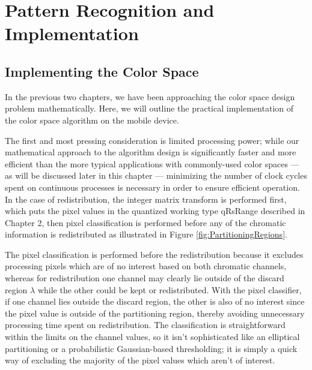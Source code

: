 \chapter{Pattern Recognition and Implementation}


\ifpdf
    \graphicspath{{Chapter4/Figs/Raster/}{Chapter4/Figs/PDF/}{Chapter4/Figs/}}
\else
    \graphicspath{{Chapter4/Figs/Vector/}{Chapter4/Figs/}}
\fi


\section{Implementing the Color Space}\label{sec:ImplementingTheColorSpace}

In the previous two chapters, we have been approaching the color space design problem mathematically. Here, we will outline the practical implementation of the color space algorithm on the mobile device.

The first and most pressing consideration is limited processing power; while our mathematical approach to the algorithm design is significantly faster and more efficient than the more typical applications with commonly-used color spaces --- as will be discussed later in this chapter --- minimizing the number of clock cycles spent on continuous processes is necessary in order to ensure efficient operation. In the case of redistribution, the integer matrix transform is performed first, which puts the pixel values in the quantized working type qRsRange described in Chapter 2, then pixel classification is performed before any of the chromatic information is redistributed as illustrated in Figure \ref{fig:PartitioningRegions}.

The pixel classification is performed before the redistribution because it excludes processing pixels which are of no interest based on both chromatic channels, whereas for redistribution one channel may clearly lie outside of the discard region $\lambda$ while the other could be kept or redistributed. With the pixel classifier, if one channel lies outside the discard region, the other is also of no interest since the pixel value is outside of the partitioning region, thereby avoiding unnecessary processing time spent on redistribution. The classification is straightforward within the limits on the channel values, so it isn't sophisticated like an elliptical partitioning or a probabilistic Gaussian-based thresholding; it is simply a quick way of excluding the majority of the pixel values which aren't of interest.


